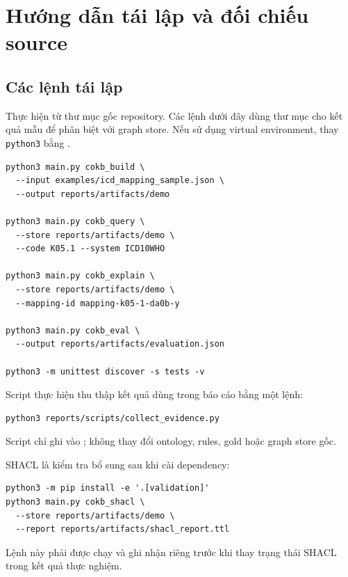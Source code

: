 \chapter{Hướng dẫn tái lập và đối chiếu source}

\section{Các lệnh tái lập}
Thực hiện từ thư mục gốc repository. Các lệnh dưới đây dùng thư mục
 cho kết quả mẫu để phân biệt với graph store.
Nếu sử dụng virtual environment, thay \texttt{python3} bằng
.
\begin{lstlisting}
python3 main.py cokb_build \
  --input examples/icd_mapping_sample.json \
  --output reports/artifacts/demo

python3 main.py cokb_query \
  --store reports/artifacts/demo \
  --code K05.1 --system ICD10WHO

python3 main.py cokb_explain \
  --store reports/artifacts/demo \
  --mapping-id mapping-k05-1-da0b-y

python3 main.py cokb_eval \
  --output reports/artifacts/evaluation.json

python3 -m unittest discover -s tests -v
\end{lstlisting}
Script  thực hiện thu thập
kết quả dùng trong báo cáo bằng một lệnh:
\begin{lstlisting}
python3 reports/scripts/collect_evidence.py
\end{lstlisting}
Script chỉ ghi vào ; không thay đổi ontology,
rules, gold hoặc graph store gốc.

SHACL là kiểm tra bổ sung sau khi cài dependency:
\begin{lstlisting}
python3 -m pip install -e '.[validation]'
python3 main.py cokb_shacl \
  --store reports/artifacts/demo \
  --report reports/artifacts/shacl_report.ttl
\end{lstlisting}
Lệnh này phải được chạy và ghi nhận riêng trước khi thay trạng thái
SHACL trong kết quả thực nghiệm.

